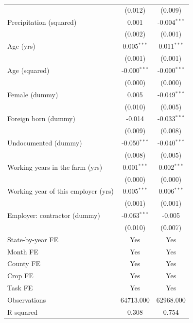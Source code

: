 \documentclass[12pt]{article}
\newcommand{\sym}[1]{\ensuremath{^{#1}}}
\begin{document}
\begin{table}[h!]
\begin{tabular}{l*{2}{c}}
                    &     (0.012)         &     (0.009)         \\
Precipitation (squared)&       0.001         &      -0.004\sym{***}\\
                    &     (0.002)         &     (0.001)         \\
Age (yrs)           &       0.005\sym{***}&       0.011\sym{***}\\
                    &     (0.001)         &     (0.001)         \\
Age (squared)       &      -0.000\sym{***}&      -0.000\sym{***}\\
                    &     (0.000)         &     (0.000)         \\
Female (dummy)      &       0.005         &      -0.049\sym{***}\\
                    &     (0.010)         &     (0.005)         \\
Foreign born (dummy)&      -0.014         &      -0.033\sym{***}\\
                    &     (0.009)         &     (0.008)         \\
Undocumented (dummy)&      -0.050\sym{***}&      -0.040\sym{***}\\
                    &     (0.008)         &     (0.005)         \\
Working years in the farm (yrs)&       0.001\sym{***}&       0.002\sym{***}\\
                    &     (0.000)         &     (0.000)         \\
Working year of this employer (yrs)&       0.005\sym{***}&       0.006\sym{***}\\
                    &     (0.001)         &     (0.001)         \\
Employer: contractor (dummy)&      -0.063\sym{***}&      -0.005         \\
                    &     (0.010)         &     (0.007)         \\
\hline
State-by-year FE    &         Yes         &         Yes         \\
Month FE            &         Yes         &         Yes         \\
County FE           &         Yes         &         Yes         \\
Crop FE             &         Yes         &         Yes         \\
Task FE             &         Yes         &         Yes         \\
Observations        &   64713.000         &   62968.000         \\
R-squared           &       0.308         &       0.754         \\
\hline\hline
\end{tabular}
\end{table}
\end{document}
